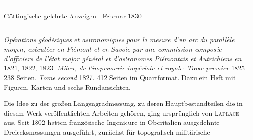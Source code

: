 \begin{center}
\rule{.85\textwidth}{.3pt}\par
Göttingische gelehrte Anzeigen.. Februar 1830.\par
\rule{.85\textwidth}{.3pt}
\end{center}
\hspace*{\parindent}\textit{Opérations géodésiques et astronomiques pour la mesure d’un arc du parallèle moyen, exécutées en Piémont et en Savoie par une commission composée d’officiers de l’état major général et d’astronomes Piémontais et Autrichiens en} 1821, 1822, 1823. \textit{Milan, de l’imprimerie impériale et royale: Tome premier} 1825. 238 Seiten. \textit{Tome second} 1827. 412 Seiten im Quartformat. Dazu ein Heft mit Figuren, Karten und sechs Rundansichten.

Die Idee zu der großen Längengradmessung, zu deren Hauptbestandteilen die in diesem Werk veröffentlichten Arbeiten gehören, ging ursprünglich von \textsc{Laplace} aus. Seit 1802 hatten französische Ingenieure in Oberitalien ausgedehnte Dreiecksmessungen ausgeführt, zunächst für topografisch-militärische
